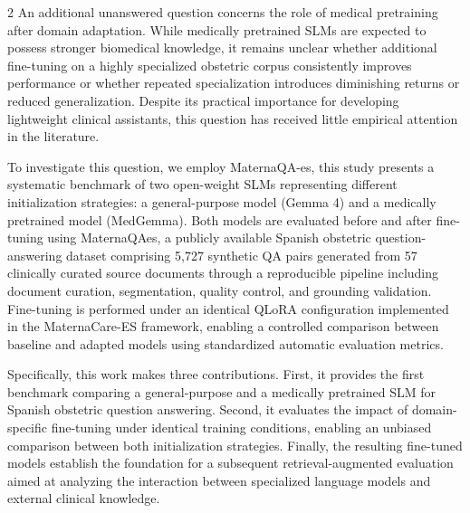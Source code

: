 \documentclass[11pt]{article}
\begin{document}
\begin{multicols}{2}
An additional unanswered question concerns the role of medical pretraining after domain adaptation. While medically pretrained SLMs are expected to possess stronger biomedical knowledge, it remains unclear whether additional fine-tuning on a highly specialized obstetric corpus consistently improves performance or whether repeated specialization introduces diminishing returns or reduced generalization. Despite its practical importance for developing lightweight clinical assistants, this question has received little empirical attention in the literature.

To investigate this question, we employ MaternaQA-es, this study presents a systematic benchmark of two open-weight SLMs representing different initialization strategies: a general-purpose model (Gemma 4) and a medically pretrained model (MedGemma). Both models are evaluated before and after fine-tuning using MaternaQA\-es, a publicly available Spanish obstetric question-answering dataset comprising 5,727 synthetic QA pairs generated from 57 clinically curated source documents through a reproducible pipeline including document curation, segmentation, quality control, and grounding validation. Fine-tuning is performed under an identical QLoRA configuration implemented in the MaternaCare-ES framework, enabling a controlled comparison between baseline and adapted models using standardized automatic evaluation metrics.

Specifically, this work makes three contributions. First, it provides the first benchmark comparing a general-purpose and a medically pretrained SLM for Spanish obstetric question answering. Second, it evaluates the impact of domain-specific fine-tuning under identical training conditions, enabling an unbiased comparison between both initialization strategies. Finally, the resulting fine-tuned models establish the foundation for a subsequent retrieval-augmented evaluation aimed at analyzing the interaction between specialized language models and external clinical knowledge.

\end{multicols}


\enlargethispage{2\baselineskip}
\end{document}
